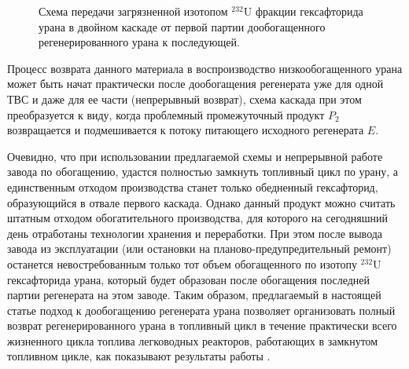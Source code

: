 \begin{figure}[ht]
  \caption{Схема передачи загрязненной изотопом $^{232}$U фракции гексафторида урана в двойном каскаде от первой партии дообогащенного регенерированного урана к последующей.}\label{P2utilizationRing}
\end{figure}

Процесс возврата данного материала в воспроизводство низкообогащенного урана может быть начат практически после дообогащения регенерата уже для одной ТВС и даже для ее части (непрерывный возврат), схема каскада при этом преобразуется к виду, когда проблемный промежуточный продукт $P_2$ возвращается и подмешивается к потоку питающего исходного регенерата $E$.

Очевидно, что при использовании предлагаемой схемы и непрерывной работе завода по обогащению, удастся полностью замкнуть топливный цикл по урану, а единственным отходом производства станет только обедненный гексафторид, образующийся в отвале первого каскада. Однако данный продукт можно считать штатным отходом
обогатительного производства, для которого на сегодняшний день отработаны технологии хранения и переработки. При этом после вывода завода из эксплуатации (или остановки на планово-предупредительный ремонт) останется невостребованным только тот объем обогащенного по изотопу $^{232}$U гексафторида урана, который будет образован после обогащения последней партии регенерата на этом заводе. Таким образом, предлагаемый в настоящей статье подход к дообогащению регенерата урана позволяет организовать полный возврат регенерированного урана в топливный цикл в течение практически всего жизненного цикла топлива легководных реакторов,
работающих в замкнутом топливном цикле, как показывают результаты работы \cite{nevinicaToplivnyyCiklLegkovodnogo2019}.



\clearpage